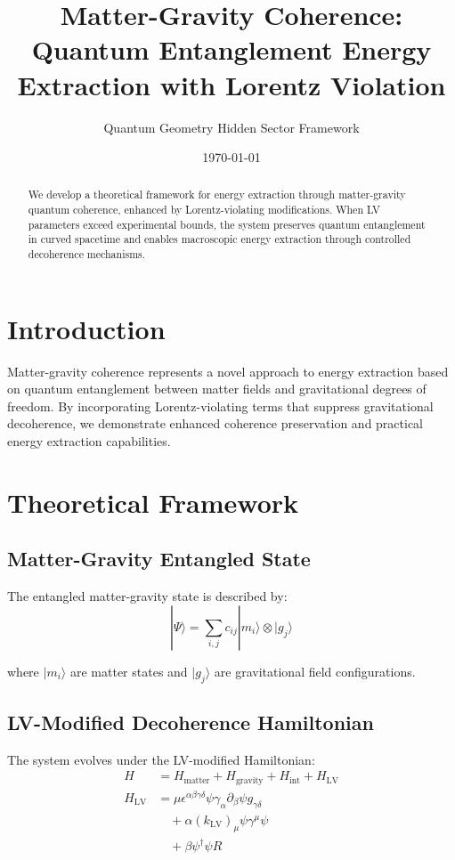 \documentclass[11pt]{article}
\title{Matter-Gravity Coherence: Quantum Entanglement Energy Extraction with Lorentz Violation}
\author{Quantum Geometry Hidden Sector Framework}
\date{\today}
\begin{document}
\maketitle

\begin{abstract}
We develop a theoretical framework for energy extraction through matter-gravity quantum coherence, enhanced by Lorentz-violating modifications. When LV parameters exceed experimental bounds, the system preserves quantum entanglement in curved spacetime and enables macroscopic energy extraction through controlled decoherence mechanisms.
\end{abstract}

\section{Introduction}

Matter-gravity coherence represents a novel approach to energy extraction based on quantum entanglement between matter fields and gravitational degrees of freedom. By incorporating Lorentz-violating terms that suppress gravitational decoherence, we demonstrate enhanced coherence preservation and practical energy extraction capabilities.

\section{Theoretical Framework}

\subsection{Matter-Gravity Entangled State}

The entangled matter-gravity state is described by:
\begin{equation}
|\Psi\rangle = \sum_{i,j} c_{ij} |m_i\rangle \otimes |g_j\rangle
\end{equation}

where $|m_i\rangle$ are matter states and $|g_j\rangle$ are gravitational field configurations.

\subsection{LV-Modified Decoherence Hamiltonian}

The system evolves under the LV-modified Hamiltonian:
\begin{align}
H &= H_{\text{matter}} + H_{\text{gravity}} + H_{\text{int}} + H_{\text{LV}} \\
H_{\text{LV}} &= \mu \epsilon^{\alpha\beta\gamma\delta} \psi \gamma_\alpha \partial_\beta \psi g_{\gamma\delta} \\
&\quad + \alpha (k_{\text{LV}})_\mu \psi \gamma^\mu \psi \\
&\quad + \beta \psi^\dagger \psi R
\end{align}
\end{document}
